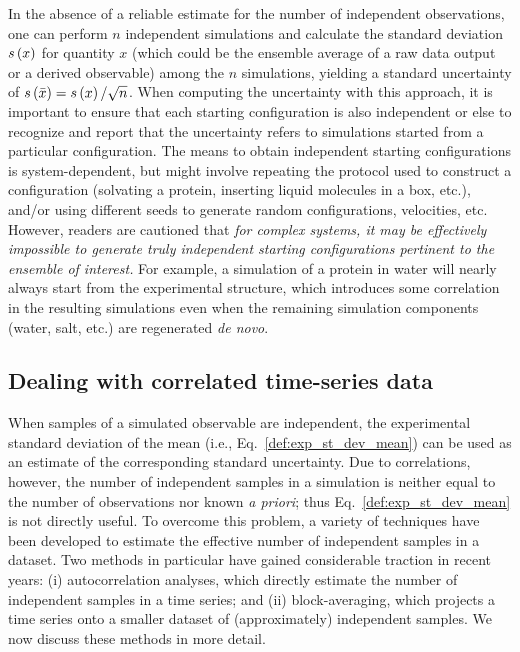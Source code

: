 In the absence of a reliable estimate for the number of independent observations, one can perform $n$ independent simulations and calculate the standard deviation $s\left( x \right)$ for quantity $x$ (which could be the ensemble average of a raw data output or a derived observable) among the $n$ simulations, yielding a standard uncertainty of $s\left( \bar{x} \right) = s\left( x \right) / \sqrt{n}$.  When computing the uncertainty with this approach, it is important to ensure that each starting configuration is also independent or else to recognize and report that the uncertainty refers to simulations started from a particular configuration.  The means to obtain independent starting configurations is system-dependent, but might involve repeating the protocol used to construct a configuration (solvating a protein, inserting liquid molecules in a box, etc.), and/or using different seeds to generate random configurations, velocities, etc.  However, readers are cautioned that \emph{for complex systems, it may be effectively impossible to generate truly independent starting configurations pertinent to the ensemble of interest.}  For example, a simulation of a protein in water will nearly always start from the experimental structure, which introduces some correlation in the resulting simulations even when the remaining simulation components (water, salt, etc.) are regenerated {\it de novo}.  

\subsection{Dealing with correlated time-series data}

When samples of a simulated observable are independent, the experimental standard deviation of the mean (i.e.,  Eq.~\hyperref[def:exp_st_dev]{\ref{def:exp_st_dev_mean}}) can be used as an estimate of the corresponding standard uncertainty.  Due to correlations, however, the number of independent samples in a simulation is neither equal to the number of observations nor known {\it a priori}; thus Eq.~\ref{def:exp_st_dev_mean} is not directly useful.  To overcome this problem, a variety of techniques have been developed to estimate the effective number of independent samples in a dataset.  Two methods in particular have gained considerable traction in recent years:  (i) autocorrelation analyses, which directly estimate the number of independent samples in a time series; and (ii) block-averaging, which projects a time series onto a smaller dataset of (approximately) independent samples.  We now discuss these methods in more detail.


